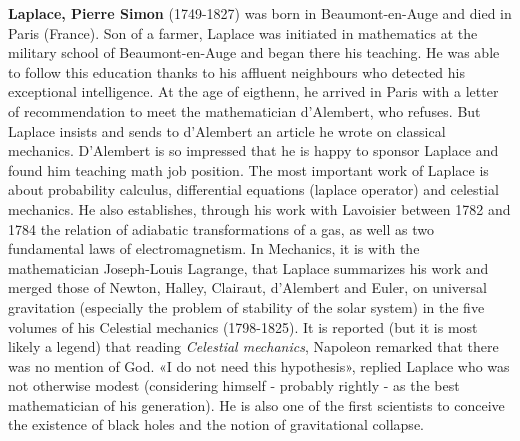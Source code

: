 \textbf{Laplace, Pierre Simon} (1749-1827) was born in Beaumont-en-Auge and died in Paris (France). Son of a farmer, Laplace was initiated in mathematics at the military school of Beaumont-en-Auge and began there his teaching. He was able to follow this education thanks to his affluent neighbours who detected his exceptional intelligence. At the age of eigthenn, he arrived in Paris with a letter of recommendation to meet the mathematician d'Alembert, who refuses. But Laplace insists and sends to d'Alembert an article he wrote on classical mechanics. D'Alembert is so impressed that he is happy to sponsor Laplace and found him teaching math job position. The most important work of Laplace is about probability calculus, differential equations (laplace operator) and celestial mechanics. He also establishes, through his work with Lavoisier between 1782 and 1784 the relation of adiabatic transformations of a gas, as well as two fundamental laws of electromagnetism. In Mechanics, it is with the mathematician Joseph-Louis Lagrange, that Laplace summarizes his work and merged those of Newton, Halley, Clairaut, d'Alembert and Euler, on universal gravitation (especially the problem of stability of the solar system) in the five volumes of his Celestial mechanics (1798-1825). It is reported (but it is most likely a legend) that reading \textit{Celestial mechanics}, Napoleon remarked that there was no mention of God. «I do not need this hypothesis», replied Laplace who was not otherwise modest (considering himself - probably rightly - as the best mathematician of his generation). He is also one of the first scientists to conceive the existence of black holes and the notion of gravitational collapse.


